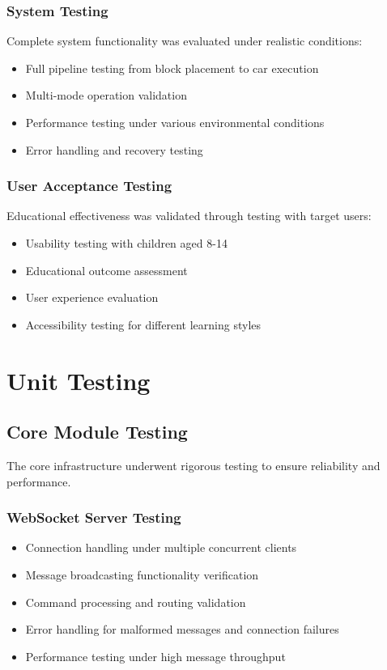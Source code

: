 \subsubsection{System Testing}
Complete system functionality was evaluated under realistic conditions:
\begin{itemize}
    \item Full pipeline testing from block placement to car execution
    \item Multi-mode operation validation
    \item Performance testing under various environmental conditions
    \item Error handling and recovery testing
\end{itemize}

\subsubsection{User Acceptance Testing}
Educational effectiveness was validated through testing with target users:
\begin{itemize}
    \item Usability testing with children aged 8-14
    \item Educational outcome assessment
    \item User experience evaluation
    \item Accessibility testing for different learning styles
\end{itemize}

\section{Unit Testing}

\subsection{Core Module Testing}

The core infrastructure underwent rigorous testing to ensure reliability and performance.

\subsubsection{WebSocket Server Testing}
\begin{itemize}
    \item Connection handling under multiple concurrent clients
    \item Message broadcasting functionality verification
    \item Command processing and routing validation
    \item Error handling for malformed messages and connection failures
    \item Performance testing under high message throughput
\end{itemize}

